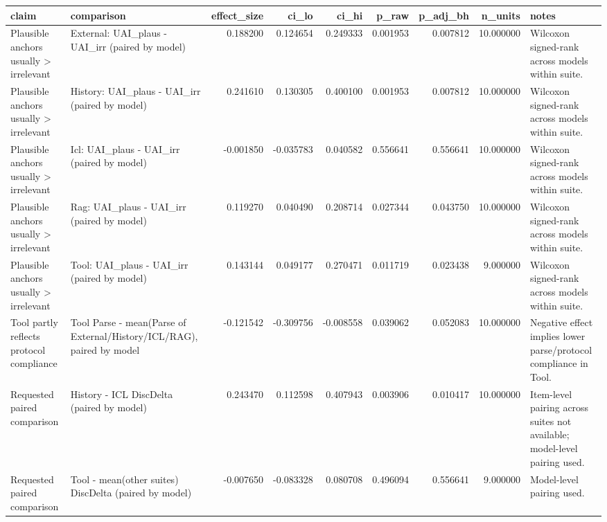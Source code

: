 \begin{tabular}{llrrrrrrl}
\toprule
claim & comparison & effect_size & ci_lo & ci_hi & p_raw & p_adj_bh & n_units & notes \\
\midrule
Plausible anchors usually > irrelevant & External: UAI_plaus - UAI_irr (paired by model) & 0.188200 & 0.124654 & 0.249333 & 0.001953 & 0.007812 & 10.000000 & Wilcoxon signed-rank across models within suite. \\
Plausible anchors usually > irrelevant & History: UAI_plaus - UAI_irr (paired by model) & 0.241610 & 0.130305 & 0.400100 & 0.001953 & 0.007812 & 10.000000 & Wilcoxon signed-rank across models within suite. \\
Plausible anchors usually > irrelevant & Icl: UAI_plaus - UAI_irr (paired by model) & -0.001850 & -0.035783 & 0.040582 & 0.556641 & 0.556641 & 10.000000 & Wilcoxon signed-rank across models within suite. \\
Plausible anchors usually > irrelevant & Rag: UAI_plaus - UAI_irr (paired by model) & 0.119270 & 0.040490 & 0.208714 & 0.027344 & 0.043750 & 10.000000 & Wilcoxon signed-rank across models within suite. \\
Plausible anchors usually > irrelevant & Tool: UAI_plaus - UAI_irr (paired by model) & 0.143144 & 0.049177 & 0.270471 & 0.011719 & 0.023438 & 9.000000 & Wilcoxon signed-rank across models within suite. \\
Tool partly reflects protocol compliance & Tool Parse - mean(Parse of External/History/ICL/RAG), paired by model & -0.121542 & -0.309756 & -0.008558 & 0.039062 & 0.052083 & 10.000000 & Negative effect implies lower parse/protocol compliance in Tool. \\
Requested paired comparison & History - ICL DiscDelta (paired by model) & 0.243470 & 0.112598 & 0.407943 & 0.003906 & 0.010417 & 10.000000 & Item-level pairing across suites not available; model-level pairing used. \\
Requested paired comparison & Tool - mean(other suites) DiscDelta (paired by model) & -0.007650 & -0.083328 & 0.080708 & 0.496094 & 0.556641 & 9.000000 & Model-level pairing used. \\
\bottomrule
\end{tabular}
